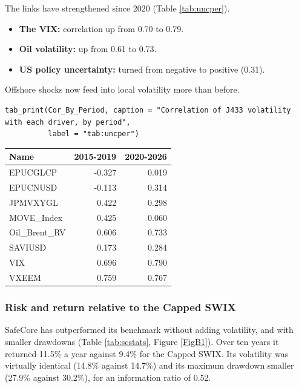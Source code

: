 \documentclass[11pt,preprint]{elsarticle}
\let\origtable\table
\let\endorigtable\endtable
\renewenvironment{table}[1][2] {
    \expandafter\origtable\expandafter[H]
} {
    \endorigtable
}
\numberwithin{equation}{section}
\numberwithin{figure}{section}
\numberwithin{table}{section}
\def\tightlist{} %
\begin{document}
The links have strengthened since 2020 (Table \ref{tab:uncper}).

\begin{itemize}
\tightlist
\item
  \textbf{The VIX:} correlation up from 0.70 to 0.79.
\item
  \textbf{Oil volatility:} up from 0.61 to 0.73.
\item
  \textbf{US policy uncertainty:} turned from negative to positive
  (0.31).
\end{itemize}

Offshore shocks now feed into local volatility more than before.

\begin{verbatim}
tab_print(Cor_By_Period, caption = "Correlation of J433 volatility with each driver, by period",
          label = "tab:uncper")
\end{verbatim}

\begin{table}[!htbp]
\centering
\caption{Correlation of J433 volatility with each driver, by period} 
\label{tab:uncper}
\begingroup\footnotesize
\begin{tabular}{lrr}
  \hline
Name & 2015-2019 & 2020-2026 \\ 
  \hline
EPUCGLCP & -0.327 & 0.019 \\ 
  EPUCNUSD & -0.113 & 0.314 \\ 
  JPMVXYGL & 0.422 & 0.298 \\ 
  MOVE\_Index & 0.425 & 0.060 \\ 
  Oil\_Brent\_RV & 0.606 & 0.733 \\ 
  SAVIUSD & 0.173 & 0.284 \\ 
  VIX & 0.696 & 0.790 \\ 
  VXEEM & 0.759 & 0.767 \\ 
   \hline
\end{tabular}
\endgroup
\end{table}

\subsubsection{Risk and return relative to the Capped
SWIX}\label{risk-and-return-relative-to-the-capped-swix}

SafeCore has outperformed its benchmark without adding volatility, and
with smaller drawdowns (Table \ref{tab:scstats}, Figure \ref{FigB1}).
Over ten years it returned 11.5\% a year against 9.4\% for the Capped
SWIX. Its volatility was virtually identical (14.8\% against 14.7\%) and
its maximum drawdown smaller (27.9\% against 30.2\%), for an information
ratio of 0.52.
\end{document}
